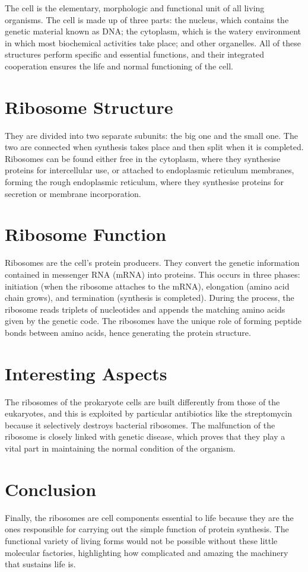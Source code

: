 \documentclass{article}
\begin{document}
	The cell is the elementary, morphologic and functional unit of all living organisms. The cell is made up of three parts: the nucleus, which contains the genetic material known as DNA; the cytoplasm, which is the watery environment in which most biochemical activities take place; and other organelles. All of these structures perform specific and essential functions, and their integrated cooperation ensures the life and normal functioning of the cell.
	
	\section*{Ribosome Structure}
	They are divided into two separate subunits: the big one and the small one. The two are connected when synthesis takes place and then split when it is completed. Ribosomes can be found either free in the cytoplasm, where they synthesise proteins for intercellular use, or attached to endoplasmic reticulum membranes, forming the rough endoplasmic reticulum, where they synthesise proteins for secretion or membrane incorporation.
	
	\section*{Ribosome Function}
	Ribosomes are the cell's protein producers. They convert the genetic information contained in messenger RNA (mRNA) into proteins. This occurs in three phases: initiation (when the ribosome attaches to the mRNA), elongation (amino acid chain grows), and termination (synthesis is completed). During the process, the ribosome reads triplets of nucleotides and appends the matching amino acids given by the genetic code. The ribosomes have the unique role of forming peptide bonds between amino acids, hence generating the protein structure.
	
	\section*{Interesting Aspects}
	The ribosomes of the prokaryote cells are built differently from those of the eukaryotes, and this is exploited by particular antibiotics like the streptomycin because it selectively destroys bacterial ribosomes. The malfunction of the ribosome is closely linked with genetic disease, which proves that they play a vital part in maintaining the normal condition of the organism.
	
	\section*{Conclusion}
	Finally, the ribosomes are cell components essential to life because they are the ones responsible for carrying out the simple function of protein synthesis. The functional variety of living forms would not be possible without these little molecular factories, highlighting how complicated and amazing the machinery that sustains life is.
	
\end{document}

